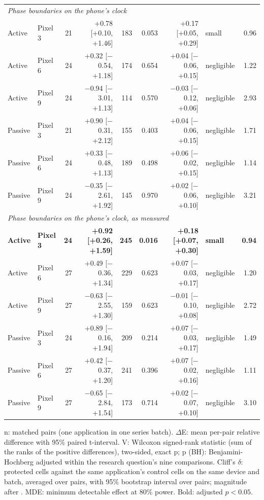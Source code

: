 \begin{table}[t]
\begin{tabular}{llrrrrrlr}
\midrule
\multicolumn{9}{l}{\textit{Phase boundaries on the phone's clock}} \\
Active & Pixel 3 & 21 & +0.78 [+0.10, +1.46] & 183 & 0.053 & +0.17 [+0.05, +0.29] & small & 0.96 \\
Active & Pixel 6 & 24 & +0.32 [$-$0.54, +1.18] & 174 & 0.654 & +0.04 [$-$0.06, +0.15] & negligible & 1.22 \\
Active & Pixel 9 & 24 & $-$0.94 [$-$3.01, +1.13] & 114 & 0.570 & $-$0.03 [$-$0.12, +0.06] & negligible & 2.93 \\
Passive & Pixel 3 & 21 & +0.90 [$-$0.31, +2.12] & 155 & 0.403 & +0.04 [$-$0.06, +0.15] & negligible & 1.71 \\
Passive & Pixel 6 & 24 & +0.33 [$-$0.48, +1.13] & 189 & 0.498 & +0.06 [$-$0.02, +0.15] & negligible & 1.14 \\
Passive & Pixel 9 & 24 & $-$0.35 [$-$2.61, +1.92] & 145 & 0.970 & +0.02 [$-$0.06, +0.10] & negligible & 3.21 \\
\midrule
\multicolumn{9}{l}{\textit{Phase boundaries on the phone's clock, as measured}} \\
\textbf{Active} & \textbf{Pixel 3} & \textbf{24} & \textbf{+0.92 [+0.26, +1.59]} & \textbf{245} & \textbf{0.016} & \textbf{+0.18 [+0.07, +0.30]} & \textbf{small} & \textbf{0.94} \\
Active & Pixel 6 & 27 & +0.49 [$-$0.36, +1.34] & 229 & 0.623 & +0.07 [$-$0.03, +0.17] & negligible & 1.20 \\
Active & Pixel 9 & 27 & $-$0.63 [$-$2.55, +1.30] & 159 & 0.623 & $-$0.01 [$-$0.10, +0.08] & negligible & 2.72 \\
Passive & Pixel 3 & 24 & +0.89 [$-$0.16, +1.94] & 209 & 0.214 & +0.07 [$-$0.03, +0.17] & negligible & 1.49 \\
Passive & Pixel 6 & 27 & +0.42 [$-$0.37, +1.20] & 241 & 0.396 & +0.07 [$-$0.02, +0.16] & negligible & 1.11 \\
Passive & Pixel 9 & 27 & $-$0.65 [$-$2.84, +1.54] & 173 & 0.714 & +0.02 [$-$0.07, +0.10] & negligible & 3.10 \\
\bottomrule
\end{tabular}
\par\smallskip\footnotesize n: matched pairs (one application in one series batch). $\Delta$E: mean per-pair relative difference with 95\% paired t-interval. V: Wilcoxon signed-rank statistic (sum of the ranks of the positive differences), two-sided, exact p; p (BH): Benjamini-Hochberg adjusted within the research question's nine comparisons. Cliff's $\delta$: protected cells against the same application's control cells on the same device and batch, averaged over pairs, with 95\% bootstrap interval over pairs; magnitude after \cite{romano2006cliff}. MDE: minimum detectable effect at 80\% power. Bold: adjusted $p < 0.05$.
\end{table}
